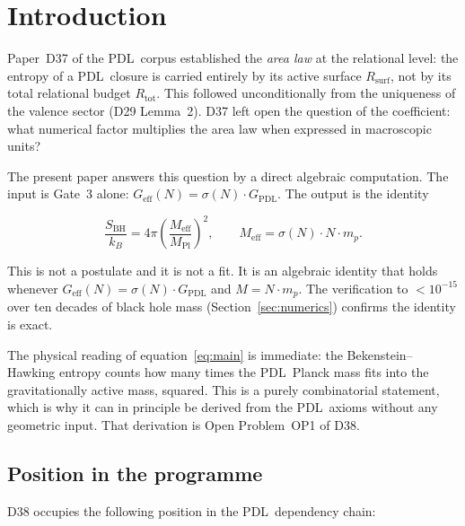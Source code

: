 \documentclass[11pt,a4paper]{article}
\theoremstyle{definition}
\newcommand{\PDL}{\textnormal{PDL}}
\newcommand{\Rtot}{R_{\mathrm{tot}}}
\newcommand{\Rsurf}{R_{\mathrm{surf}}}
\newcommand{\sig}{\sigma}
\newcommand{\GPDL}{G_{\mathrm{PDL}}}
\newcommand{\Geff}{G_{\mathrm{eff}}}
\newcommand{\SBH}{S_{\mathrm{BH}}}
\newcommand{\Meff}{M_{\mathrm{eff}}}
\newcommand{\MPl}{M_{\mathrm{Pl}}}
\begin{document}
\section{Introduction}
\label{sec:intro}

Paper~D37 of the \PDL\ corpus established the \emph{area law} at the
relational level: the entropy of a \PDL\ closure is carried entirely by its
active surface $\Rsurf$, not by its total relational budget $\Rtot$. This
followed unconditionally from the uniqueness of the valence sector
(D29 Lemma~2). D37 left open the question of the coefficient: what
numerical factor multiplies the area law when expressed in macroscopic units?

The present paper answers this question by a direct algebraic computation.
The input is Gate~3 alone: $\Geff(N) = \sig(N)\cdot\GPDL$. The output is
the identity

\begin{equation}
\frac{\SBH}{k_B} = 4\pi\left(\frac{\Meff}{\MPl}\right)^2,
\qquad
\Meff = \sig(N)\cdot N\cdot m_p.
\label{eq:main}
\end{equation}

This is not a postulate and it is not a fit. It is an algebraic identity that
holds whenever $\Geff(N) = \sig(N)\cdot\GPDL$ and $M = N\cdot m_p$. The
verification to $< 10^{-15}$ over ten decades of black hole mass (Section~\ref{sec:numerics})
confirms the identity is exact.

The physical reading of equation~\eqref{eq:main} is immediate: the
Bekenstein--Hawking entropy counts how many times the \PDL\ Planck mass fits
into the gravitationally active mass, squared. This is a purely combinatorial
statement, which is why it can in principle be derived from the \PDL\ axioms
without any geometric input. That derivation is Open Problem~OP1 of D38.

\subsection{Position in the programme}

D38 occupies the following position in the \PDL\ dependency chain:
\end{document}
